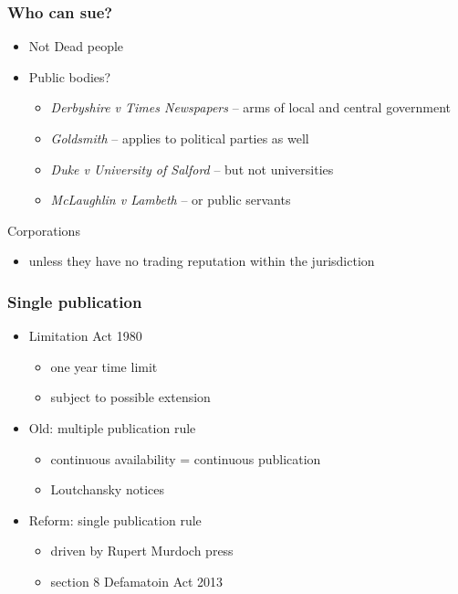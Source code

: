 \documentclass[ignorenonframetext,]{beamer}
\begin{document}
\begin{frame}
\frametitle{Who can sue?}


  \begin{itemize}
  \item Not Dead people
  \item Public bodies?

    \begin{itemize}
    \item {\it Derbyshire v Times Newspapers}{ -- arms of local and central government}
    \item {\it Goldsmith}{ -- applies to political parties as well}
    \item {\it Duke v University of Salford} -- but not universities
    \item {\it McLaughlin v Lambeth} -- or public servants
    \end{itemize}
  \end{itemize}
\item Corporations
  \begin{itemize}
  \item unless they have no trading reputation within the
    jurisdiction
  \end{itemize}

\end{frame}

\begin{frame}
\frametitle{Single publication}

\begin{itemize}
\item  Limitation Act 1980
  \begin{itemize}
  \item  one year time limit
  \item  subject to possible extension
  \end{itemize}
\item  Old: multiple publication rule
  \begin{itemize}
  \item continuous availability = continuous publication
  \item Loutchansky notices
  \end{itemize}
\item  Reform: single publication rule
  \begin{itemize}
  \item driven by Rupert Murdoch press
  \item section 8 Defamatoin Act 2013
  \end{itemize}
\end{itemize}

\end{frame}
\end{document}
